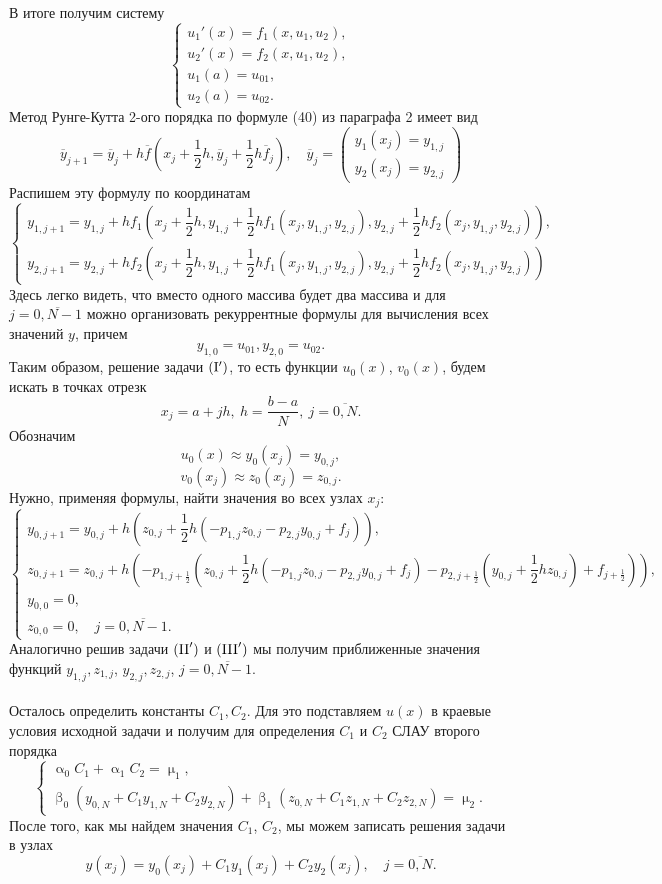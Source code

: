 \documentclass[a4paper, 12pt]{report}
\renewcommand{\alpha}{\upalpha}
\renewcommand{\beta}{\upbeta}
\renewcommand{\mu}{\upmu}
\begin{document}
	 В итоге получим систему 
	 $$
	 \begin{cases}
	 	u_1'(x) = f_1(x, u_1, u_2),\\
	 	u_2'(x) = f_2(x, u_1, u_2),\\
	 	u_1(a) = u_{01},\\
	 	u_2(a) = u_{02}.
	 \end{cases}
	 $$
	 Метод Рунге-Кутта 2-ого порядка по формуле (40) из параграфа 2 имеет вид 
	 $$\overline y_{j+1} = \overline y_j + h\overline f\left(x_j + \dfrac 12 h , \overline y_j + \dfrac 12 h \overline f_j\right),\quad \overline y_j = \begin{pmatrix}
	 	y_1(x_j) = y_{1,j}\\
	 	y_2(x_j) = y_{2,j}
	 \end{pmatrix}$$
	 Распишем эту формулу по координатам
	 $$\begin{cases}
	 	y_{1, j+1} = y_{1,j} + hf_1\left(x_j + \dfrac 12 h, y_{1,j} + \dfrac 12 hf_1(x_j, y_{1,j}, y_{2,j}), y_{2,j} + \dfrac12 h f_2(x_j, y_{1,j}, y_{2,j})\right),\\
	 	y_{2, j+1} = y_{2,j} + hf_2\left(x_j + \dfrac 12 h, y_{1,j} + \dfrac 12 hf_1(x_j, y_{1,j}, y_{2,j}), y_{2,j} + \dfrac12 h f_2(x_j, y_{1,j}, y_{2,j})\right)
	 \end{cases}$$
	 Здесь легко видеть, что вместо одного массива будет два массива и для $j = \overline{0, N-1}$ можно организовать рекуррентные формулы для вычисления всех значений $y$, причем
	 $$y_{1,0} = u_{01}, y_{2,0} = u_{02}.$$
	 Таким образом, решение задачи $(\rm{I}')$, то есть функции $u_0(x)$, $v_0(x)$, будем искать в точках отрезк $$x_j = a+jh,\ h = \dfrac{b-a}{N},\ j = \overline{0,N}.$$
	 Обозначим 
	 $$u_0(x) \approx y_0(x_j) = y_{0,j},$$
	 $$v_0(x_j) \approx z_0(x_j) = z_{0,j}.$$
	 Нужно, применяя формулы, найти значения во всех узлах $x_j$:
	 $$\begin{cases}
	 	y_{0, j+1} = y_{0,j} + h\left(z_{0,j} + \dfrac12 h(-p_{1,j} z_{0,j} - p_{2,j}y_{0,j} + f_j)\right),\\
	 	z_{0,j+1} = z_{0,j} + h\left( -p_{1, j+\frac12}(z_{0,j} + \dfrac 12 h (-p_{1,j} z_{0,j} - p_{2,j} y_{0,j} + f_j) - p_{2, j+\frac12} (y_{0,j} + \dfrac12 hz_{0,j}) + f_{j+\frac12})\right),\\
	 	y_{0,0} = 0,\\
	 	z_{0,0} = 0,\quad j = \overline{0,N-1}.
	 \end{cases}$$
	 Аналогично решив задачи $(\rm{II}')$ и $(\rm{III}')$ мы получим приближенные значения функций $y_{1,j}, z_{1,j}$, $y_{2,j}, z_{2,j}$, $j = \overline{0,N-1}$.\\\\
	 Осталось определить константы $C_1, C_2$. Для это подставляем $u(x)$ в краевые условия исходной задачи и получим для определения $C_1$ и $C_2$ СЛАУ второго порядка
	 $$
	 \begin{cases}
	 	\alpha_0 C_1 + \alpha_1 C_2 = \mu _1,\\
	 	\beta_0 (y_{0,N} + C_1y_{1, N} + C_2 y_{2,N}) + \beta_1 (z_{0,N} + C_1z_{1, N} + C_2 z_{2,N}) = \mu_2.
	 \end{cases}
	 $$
	 После того, как мы найдем значения $C_1$, $C_2$, мы можем записать решения задачи в узлах $$y(x_j) = y_0(x_j) + C_1y_1(x_j) + C_2 y_2(x_j),\quad j=\overline{0, N}.$$
\end{document}
